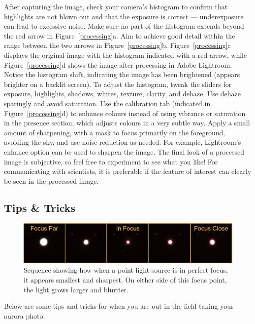 \documentclass{article}
\begin{document}
After capturing the image, check your camera's histogram to confirm that highlights are not blown out and that the exposure is correct --- underexposure can lead to excessive noise. Make sure no part of the histogram extends beyond the red arrow in Figure~\ref{processing}a. Aim to achieve good detail within the range between the two arrows in Figure~\ref{processing}b. Figure~\ref{processing}c displays the original image with the histogram indicated with a red arrow, while Figure~\ref{processing}d shows the image after processing in Adobe Lightroom. Notice the histogram shift, indicating the image has been brightened (appears brighter on a backlit screen). To adjust the histogram, tweak the sliders for exposure, highlights, shadows, whites, texture, clarity, and dehaze. Use dehaze sparingly and avoid saturation. Use the calibration tab (indicated in Figure~\ref{processing}d) to enhance colours instead of using vibrance or saturation in the presence section, which adjusts colours in a very subtle way. Apply a small amount of sharpening, with a mask to focus primarily on the foreground, avoiding the sky, and use noise reduction as needed. For example, Lightroom’s enhance option can be used to sharpen the image. The final look of a processed image is subjective, so feel free to experiment to see what you like! For communicating with scientists, it is preferable if the feature of interest can clearly be seen in the processed image. 



\subsection{Tips \& Tricks}


\begin{figure}
  \includegraphics[width=\linewidth]{Fig14_focusing.jpg}
  \caption{Sequence showing how when a point light source is in perfect focus, it appears smallest and sharpest. On either side of this focus point, the light grows larger and blurrier.}
  \label{Focusing}
\end{figure}



Below are some tips and tricks for when you are out in the field taking your aurora photo:
\end{document}
